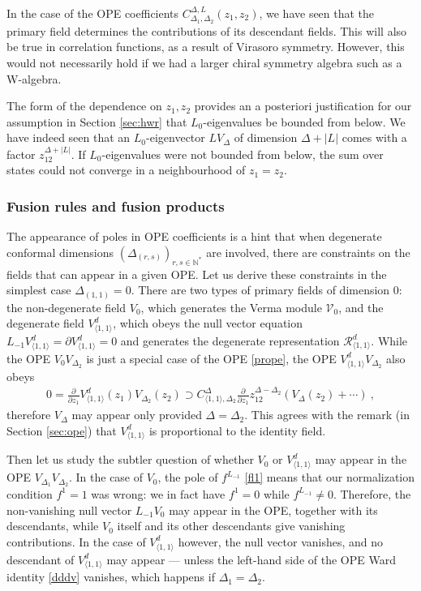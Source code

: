 \documentclass[12pt, a4paper]{article}
\theoremstyle{break}
\begin{document}
In the case of the OPE coefficients $C^{\Delta,L}_{\Delta_1,\Delta_2}(z_1,z_2)$, we have seen that the primary field determines the contributions of its descendant fields. This will also be true in correlation functions, as a result of Virasoro symmetry. However, this would not necessarily hold if we had a larger chiral symmetry algebra such as a W-algebra. 

The form of the dependence on $z_1,z_2$ provides an a posteriori justification for our assumption in Section \ref{sec:hwr} that $L_0$-eigenvalues be bounded from below. We have indeed seen that an $L_0$-eigenvector $LV_\Delta$ of dimension $\Delta+|L|$ comes with a factor $z_{12}^{\Delta+|L|}$. If $L_0$-eigenvalues were not bounded from below, the sum over states could not converge in a neighbourhood of $z_1=z_2$. 


\subsubsection{Fusion rules and fusion products}\label{sec:dope}

The appearance of poles in OPE coefficients is a hint that when degenerate conformal dimensions $(\Delta_{(r,s)})_{r,s\in\mathbb{N}^*}$ are involved, there are constraints on the fields that can appear in a given OPE. Let us derive these constraints in the simplest case $\Delta_{(1,1)}=0$. There are two types of primary fields of dimension $0$: the non-degenerate field $V_0$, which generates the Verma module $\mathcal{V}_0$, and the degenerate field $V^d_{\langle 1,1\rangle}$, which obeys the null vector equation $L_{-1}V^d_{\langle 1,1\rangle}=\partial V^d_{\langle 1,1\rangle}=0$ and generates the degenerate representation $\mathcal{R}^d_{\langle 1,1\rangle}$. While the OPE $V_0V_{\Delta_2}$ is just a special case of the OPE \eqref{prope}, 
the OPE $V^d_{\langle 1,1\rangle}V_{\Delta_2}$ also obeys 
\begin{align}
 0 = \frac{\partial}{\partial z_1} V^d_{\langle 1,1\rangle}(z_1)V_{\Delta_2}(z_2) \supset C_{\langle 1,1\rangle,\Delta_2}^{\Delta} \frac{\partial}{\partial z_1} z_{12}^{\Delta-\Delta_2} \left(V_\Delta(z_2) +\cdots \right) \ ,
\end{align}
therefore $V_\Delta$ may appear only provided $\Delta=\Delta_2$. This agrees with the remark (in Section \ref{sec:ope}) that $V^d_{\langle 1,1\rangle}$ is proportional to the identity field. 

Then let us study the subtler question of whether $V_0$ or $V^d_{\langle 1,1\rangle}$ may appear in the OPE $V_{\Delta_1}V_{\Delta_2}$. In the case of $V_0$, the pole of $f^{L_{-1}}$ \eqref{fl1} means that our normalization condition $f^1=1$ was wrong: we in fact have $f^1=0$ while $f^{L_{-1}}\neq 0$. Therefore, the non-vanishing null vector $L_{-1}V_0$ may appear in the OPE, together with its descendants, while $V_0$ itself and its other descendants give vanishing contributions. In the case of $V^d_{\langle 1,1\rangle}$ however, the null vector vanishes, and no descendant of $V^d_{\langle 1,1\rangle}$ may appear --- unless the left-hand side of the OPE Ward identity \eqref{dddv} vanishes, which happens if $\Delta_1=\Delta_2$. 
\end{document}
